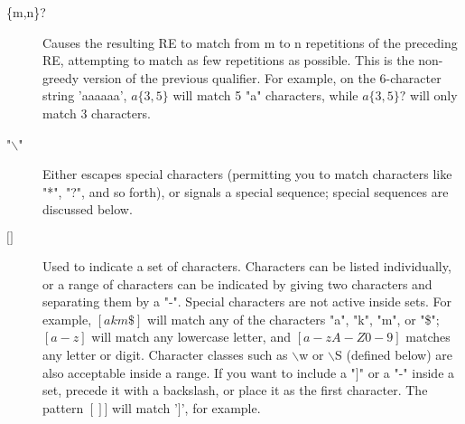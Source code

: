 \begin{description}
    \item [\{m,n\}?]
    Causes the resulting RE to match from m to n repetitions of the preceding RE, attempting to match as few repetitions as possible. This is the non-greedy version of the previous qualifier. For example, on the 6-character string 'aaaaaa', $a\{3,5\}$ will match 5 "a" characters, while $a\{3,5\}?$ will only match 3 characters.
    \item ["$\backslash$"]
    Either escapes special characters (permitting you to match characters like "*", "?", and so forth), or signals a special sequence; special sequences are discussed below.
    \item [$\lbrack\rbrack$]
    Used to indicate a set of characters. Characters can be listed individually, or a range of characters can be indicated by giving two characters and separating them by a "-". Special characters are not active inside sets. For example, $[akm\$]$ will match any of the characters "a", "k", "m", or "\$"; $[a-z]$ will match any lowercase letter, and $[a-zA-Z0-9]$ matches any letter or digit. Character classes such as $\backslash$w or $\backslash$S (defined below) are also acceptable inside a range. If you want to include a "$]$" or a "-" inside a set, precede it with a backslash, or place it as the first character. The pattern $[]]$ will match '$]$', for example.


\end{description}
